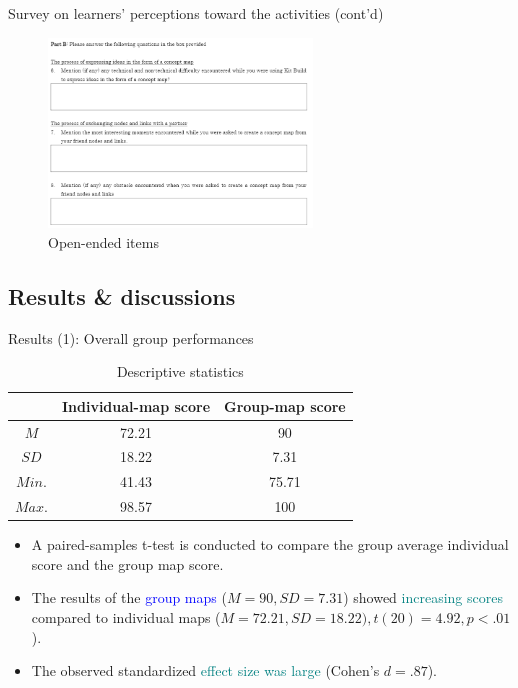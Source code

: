 \begin{frame}{Survey on learners' perceptions toward the activities (cont'd)}
    \begin{figure}[tb]
        \begin{center}
            \includegraphics[width=70mm]{images/rqa_questionnaire_open.png}
        \end{center}
        \caption{Open-ended items}
        \label{questionnaire_open}
    \end{figure}
\end{frame}

\subsection{Results \& discussions}
\begin{frame}{Results (1): Overall group performances}
\begin{table}[tb]
    \caption{Descriptive statistics}
    \label{a1::group_performance}
    \begin{center}
        \begin{tabular}{c|c|c}
            \hline
            & Individual-map score & Group-map score\\
            \hline
            $M$ & 72.21 & 90 \\
            $SD$ & 18.22 & 7.31 \\
            $Min.$ & 41.43 & 75.71 \\
            $Max.$ & 98.57 & 100 \\
            \hline
        \end{tabular}
       
    \end{center}
    
    {\footnotesize
    \begin{itemize}
        \item A paired-samples t-test is conducted to compare the group average individual score and the group map score.
        \item The results of the \textcolor{blue}{group maps} ($M = 90, SD = 7.31$) showed \textcolor{teal}{increasing scores} compared to individual maps ($M = 72.21, SD = 18.22), t(20) = 4.92, p < .01$).
        \item The observed standardized \textcolor{teal}{effect size was large} (Cohen’s $d = .87$). 
    \end{itemize}
    }
    
\end{table}


\end{frame}

